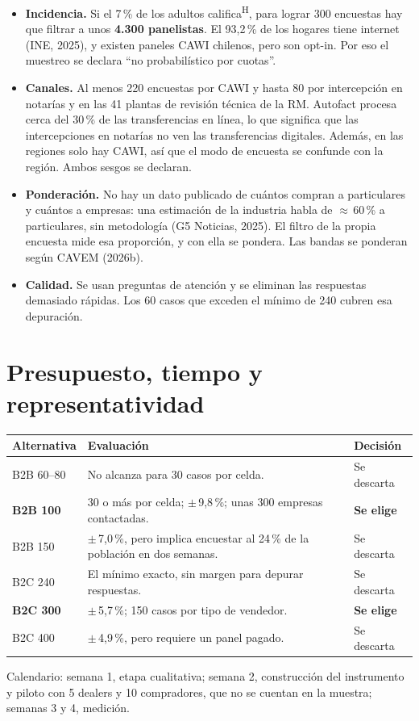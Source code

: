 \documentclass[11pt,a4paper]{article}
\newcommand{\hyp}{\textsuperscript{\textsf{\scriptsize H}}}
\begin{document}
\begin{itemize}
\item \textbf{Incidencia.} Si el 7\,\% de los adultos califica\hyp, para lograr 300 encuestas hay que filtrar a unos \textbf{4.300 panelistas}. El 93,2\,\% de los hogares tiene internet (INE, 2025), y existen paneles CAWI chilenos, pero son opt-in. Por eso el muestreo se declara \enquote{no probabilístico por cuotas}.
\item \textbf{Canales.} Al menos 220 encuestas por CAWI y hasta 80 por intercepción en notarías y en las 41 plantas de revisión técnica de la RM. Autofact procesa cerca del 30\,\% de las transferencias en línea, lo que significa que las intercepciones en notarías no ven las transferencias digitales. Además, en las regiones solo hay CAWI, así que el modo de encuesta se confunde con la región. Ambos sesgos se declaran.
\item \textbf{Ponderación.} No hay un dato publicado de cuántos compran a particulares y cuántos a empresas: una estimación de la industria habla de $\approx$\,60\,\% a particulares, sin metodología (G5 Noticias, 2025). El filtro de la propia encuesta mide esa proporción, y con ella se pondera. Las bandas se ponderan según CAVEM (2026b).
\item \textbf{Calidad.} Se usan preguntas de atención y se eliminan las respuestas demasiado rápidas. Los 60 casos que exceden el mínimo de 240 cubren esa depuración.
\end{itemize}

\section{Presupuesto, tiempo y representatividad}
\begin{center}\small
\begin{tabularx}{\textwidth}{@{}p{2.6cm}LL@{}}
\toprule
\textbf{Alternativa} & \textbf{Evaluación} & \textbf{Decisión}\\
\midrule
B2B 60–80 & No alcanza para 30 casos por celda. & Se descarta\\
\textbf{B2B 100} & 30 o más por celda; $\pm$\,9,8\,\%; unas 300 empresas contactadas. & \textbf{Se elige}\\
B2B 150 & $\pm$\,7,0\,\%, pero implica encuestar al 24\,\% de la población en dos semanas. & Se descarta\\
B2C 240 & El mínimo exacto, sin margen para depurar respuestas. & Se descarta\\
\textbf{B2C 300} & $\pm$\,5,7\,\%; 150 casos por tipo de vendedor. & \textbf{Se elige}\\
B2C 400 & $\pm$\,4,9\,\%, pero requiere un panel pagado. & Se descarta\\
\bottomrule
\end{tabularx}
\end{center}
Calendario: semana 1, etapa cualitativa; semana 2, construcción del instrumento y piloto con 5 dealers y 10 compradores, que no se cuentan en la muestra; semanas 3 y 4, medición.
\end{document}

